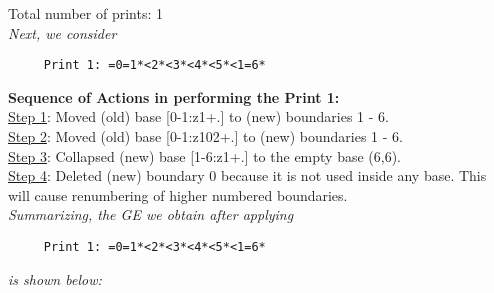 \documentclass[final]{article}
\begin{document}
Total number of prints: 1\\
{\em Next, we consider}
\begin{verbatim}
     Print 1: =0=1*<2*<3*<4*<5*<1=6*
\end{verbatim}
{\bf Sequence of Actions in performing the Print 1:}\\
{\underline{Step 1}:} Moved (old) base [0-1:z1+.]  to (new) boundaries 1 - 6.\\
{\underline{Step 2}:} Moved (old) base [0-1:z102+.]  to (new) boundaries 1 - 6.\\
{\underline{Step 3}:} Collapsed (new) base [1-6:z1+.]  to the empty base (6,6).
\\
{\underline{Step 4}:} Deleted (new) boundary 0 because it is not used inside any base.  This will cause renumbering of higher numbered boundaries.
\\[0.1in]
{\em Summarizing, the GE we obtain after applying}
\begin{verbatim}
     Print 1: =0=1*<2*<3*<4*<5*<1=6*
\end{verbatim}
{\em is shown below:}
\end{document}
